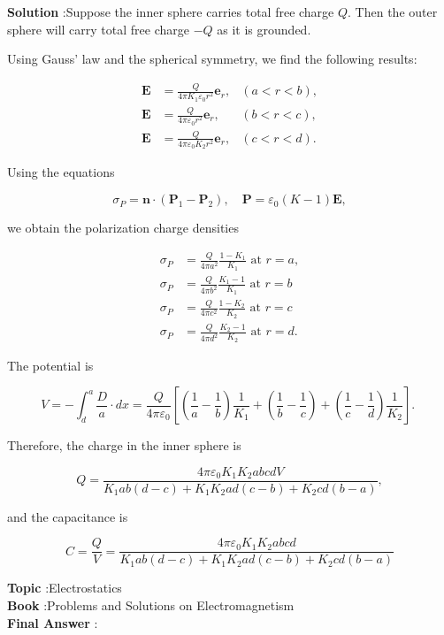\documentclass[10pt]{article}
\begin{document}
\textbf{Solution} :Suppose the inner sphere carries total free charge $Q$. Then the outer sphere will carry total free charge $-Q$ as it is grounded.

 Using Gauss' law and the spherical symmetry, we find the following results:

$$
\begin{array}{rlr}
\mathbf{E} & =\frac{Q}{4 \pi K_{1} \varepsilon_{0} r^{2}} \mathbf{e}_{r}, & (a<r<b), \\
\mathbf{E} & =\frac{Q}{4 \pi \varepsilon_{0} r^{2}} \mathbf{e}_{r}, & (b<r<c), \\
\mathbf{E} & =\frac{Q}{4 \pi \varepsilon_{0} K_{2} r^{2}} \mathbf{e}_{r}, & (c<r<d) .
\end{array}
$$

 Using the equations

$$
\sigma_{P}=\mathbf{n} \cdot\left(\mathbf{P}_{1}-\mathbf{P}_{2}\right), \quad \mathbf{P}=\varepsilon_{0}(K-1) \mathbf{E},
$$

we obtain the polarization charge densities

$$
\begin{aligned}
\sigma_{P} &=\frac{Q}{4 \pi a^{2}} \frac{1-K_{1}}{K_{1}} \text { at } r=a, \\
\sigma_{P} &=\frac{Q}{4 \pi b^{2}} \frac{K_{1}-1}{K_{1}} \text { at } r=b \\
\sigma_{P} &=\frac{Q}{4 \pi c^{2}} \frac{1-K_{2}}{K_{2}} \text { at } r=c \\
\sigma_{P} &=\frac{Q}{4 \pi d^{2}} \frac{K_{2}-1}{K_{2}} \text { at } r=d .
\end{aligned}
$$

 The potential is

$$
V=-\int_{d}^{a} \frac{D}{a} \cdot d x=\frac{Q}{4 \pi \varepsilon_{0}}\left[\left(\frac{1}{a}-\frac{1}{b}\right) \frac{1}{K_{1}}+\left(\frac{1}{b}-\frac{1}{c}\right)+\left(\frac{1}{c}-\frac{1}{d}\right) \frac{1}{K_{2}}\right] \text {. }
$$

Therefore, the charge in the inner sphere is

$$
Q=\frac{4 \pi \varepsilon_{0} K_{1} K_{2} a b c d V}{K_{1} a b(d-c)+K_{1} K_{2} a d(c-b)+K_{2} c d(b-a)},
$$

and the capacitance is

$$
C=\frac{Q}{V}=\frac{4 \pi \varepsilon_{0} K_{1} K_{2} a b c d}{K_{1} a b(d-c)+K_{1} K_{2} a d(c-b)+K_{2} c d(b-a)}
$$

\textbf{Topic} :Electrostatics\\
\textbf{Book} :Problems and Solutions on Electromagnetism\\
\textbf{Final Answer} :\\
\end{document}
